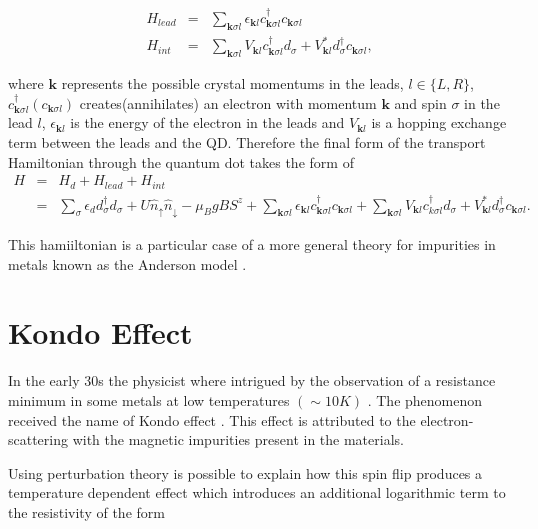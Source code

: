 \begin{eqnarray*}
H_{lead} & = & \sum_{\mathbf{k}\sigma l}\epsilon_{\mathbf{k}l}c_{\mathbf{k}\sigma l}^{\dagger}c_{\mathbf{k}\sigma l}\\
H_{int} & = & \sum_{\mathbf{k}\sigma l}V_{\mathbf{k}l}c_{\mathbf{k}\sigma l}^{\dagger}d_{\sigma}+V_{\mathbf{k}l}^{*}d_{\sigma}^{\dagger}c_{\mathbf{k}\sigma l},
\end{eqnarray*}


where $\mathbf{k}$ represents the possible crystal momentums in the
leads, $l\in\{L,R\}$, $c_{\mathbf{k}\sigma l}^{\dagger}(c_{\mathbf{k}\sigma l})$
creates(annihilates) an electron with momentum $\mathbf{k}$ and spin
$\sigma$ in the lead $l$, $\epsilon_{\mathbf{k}l}$ is the energy
of the electron in the leads and $V_{\mathbf{k}l}$ is a hopping exchange
term between the leads and the QD. Therefore the final form of the
transport Hamiltonian through the quantum dot takes the form of 
\begin{eqnarray}
H & = & H_{d}+H_{lead}+H_{int}\nonumber \\
 & = & \sum_{\sigma}\epsilon_{d}d_{\sigma}^{\dagger}d_{\sigma}+U\hat{n}_{\uparrow}\hat{n}_{\downarrow}-\mu_{B}gBS^{z}+\sum_{\mathbf{k}\sigma l}\epsilon_{\mathbf{k}l}c_{\mathbf{k}\sigma l}^{\dagger}c_{\mathbf{k}\sigma l}+\sum_{\mathbf{k}\sigma l}V_{\mathbf{k}l}c_{k\sigma l}^{\dagger}d_{\sigma}+V_{\mathbf{k}l}^{*}d_{\sigma}^{\dagger}c_{\mathbf{k}\sigma l}.\label{eq:Anderson}
\end{eqnarray}


This hamiiltonian is a particular case of a more general theory for
impurities in metals known as the Anderson model \citep{anderson_localized_1961}.


\section{Kondo Effect}

In the early 30s the physicist where intrigued by the observation of a resistance minimum in some metals at low temperatures $(\sim 10K)$ \cite{sindel_numerical_2005} . The phenomenon received the name of Kondo effect \citep{hewson_kondo_1997}. This effect is attributed to the electron-scattering with the magnetic impurities present in the materials. 

Using perturbation theory is possible to explain how this spin flip produces a  temperature dependent effect which  introduces an additional logarithmic term to the resistivity of the form

